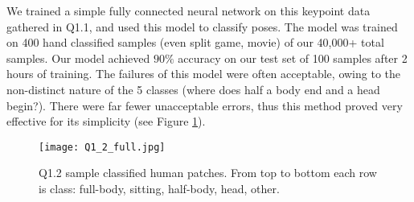 We trained a simple fully connected neural network on this keypoint data gathered in Q1.1, and used this model to classify poses.
The model was trained on 400 hand classified samples (even split game, movie) of our 40,000+ total samples.
Our model achieved $90\%$ accuracy on our test set of 100 samples after 2 hours of training.
The failures of this model were often acceptable, owing to the non-distinct nature of the 5 classes (where does half a body end and a head begin?).
There were far fewer unacceptable errors, thus this method proved very effective for its simplicity (see Figure \ref{fig:Q1_2}).

\begin{figure}[h!]
  \begin{center}
  \texttt{[image: Q1\_2\_full.jpg]}
    \caption{Q1.2 sample classified human patches. From top to bottom each row is class: full-body, sitting, half-body, head, other.}
    \label{fig:Q1_2}
  \end{center}
  \end{figure}